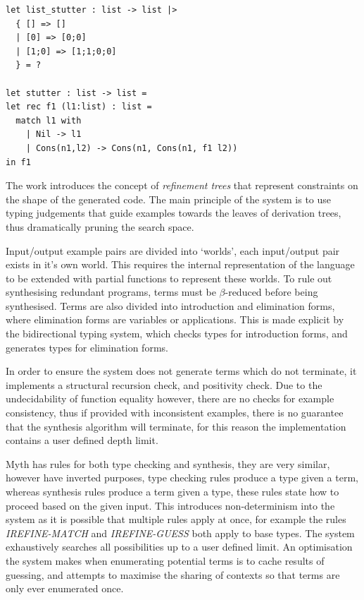 \documentclass[a4paper]{article}
\begin{document}
\begin{center}
\begin{verbatim}
let list_stutter : list -> list |>
  { [] => []
  | [0] => [0;0]
  | [1;0] => [1;1;0;0]
  } = ?

let stutter : list -> list =
let rec f1 (l1:list) : list =
  match l1 with 
	| Nil -> l1
	| Cons(n1,l2) -> Cons(n1, Cons(n1, f1 l2))
in f1
\end{verbatim}
\end{center}

The work introduces the concept of \emph{refinement trees} that represent constraints on the shape of the generated code. 
The main principle of the system is to use typing judgements that guide examples towards the leaves of derivation trees,
thus dramatically pruning the search space.  

Input/output example pairs are divided into `worlds', each input/output pair exists in it's own world. This requires the internal representation 
of the language to be extended with partial functions to represent these worlds. 
To rule out synthesising redundant programs, terms must be \(\beta\)-reduced before being synthesised. Terms are also divided into introduction 
and elimination forms, where elimination forms are variables or applications. This is made explicit by the bidirectional typing system, 
which checks types for introduction forms, and generates types for elimination forms.

In order to ensure the system does not generate terms which do not terminate, it implements a structural recursion check, and positivity check.
Due to the undecidability of function equality however, there are no checks for example consistency, thus if provided with inconsistent examples, there
is no guarantee that the synthesis algorithm will terminate, for this reason the implementation contains a user defined depth limit. 

Myth has rules for both type checking and synthesis, they are very similar, however have inverted purposes, type checking rules produce a 
type given a term, whereas synthesis rules produce a term given a type, these rules state how to proceed based on the given input. This introduces
non-determinism into the system as it is possible that multiple rules apply at once, for example the rules \emph{IREFINE-MATCH} and \emph{IREFINE-GUESS} both 
apply to base types. The system exhaustively searches all possibilities up to a user defined limit. An optimisation the system makes when enumerating potential 
terms is to cache results of guessing, and attempts to maximise the sharing of contexts so that terms are only ever enumerated once. 
\end{document}
